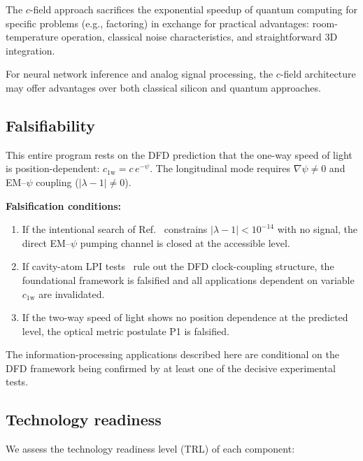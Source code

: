 \documentclass[aps,prd,twocolumn,superscriptaddress,nofootinbib,floatfix]{revtex4-2}
\newcommand{\psifield}{\psi}
\newcommand{\cfield}{c_{\text{1w}}}
\newcommand{\cvac}{c}
\begin{document}
The $c$-field approach sacrifices the exponential speedup of
quantum computing for specific problems (e.g., factoring) in
exchange for practical advantages: room-temperature operation,
classical noise characteristics, and straightforward 3D
integration.

For neural network inference and analog signal processing,
the $c$-field architecture may offer advantages over both
classical silicon and quantum approaches.

\subsection{Falsifiability}

This entire program rests on the DFD prediction that the one-way
speed of light is position-dependent: $\cfield = \cvac\,e^{-\psifield}$.
The longitudinal mode requires $\nabla\psifield \neq 0$ and
EM--$\psifield$ coupling ($|\lambda-1| \neq 0$).

\textbf{Falsification conditions:}
\begin{enumerate}
\item If the intentional search of Ref.~\cite{Alcock2025EMCoupling}
constrains $|\lambda-1| < 10^{-14}$ with no signal, the direct
EM--$\psifield$ pumping channel is closed at the accessible level.

\item If cavity-atom LPI tests~\cite{Alcock2025DFD} rule out the
DFD clock-coupling structure, the foundational framework is
falsified and all applications dependent on variable $\cfield$
are invalidated.

\item If the two-way speed of light shows no position dependence
at the predicted level, the optical metric postulate P1 is
falsified.
\end{enumerate}

The information-processing applications described here are
conditional on the DFD framework being confirmed by at least
one of the decisive experimental tests.

\subsection{Technology readiness}

We assess the technology readiness level (TRL) of each component:
\end{document}
